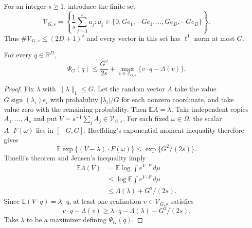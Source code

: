 For an integer $s\geq1$, introduce the finite set
\[
 \mathcal V_{G,s}
 =\left\{\frac1s\sum_{j=1}^s a_j:
        a_j\in\{0,Ge_1,-Ge_1,\ldots,Ge_D,-Ge_D\}\right\}.
\]
Thus $\#\mathcal V_{G,s}\leq(2D+1)^s$ and every vector in this set has
$\ell^1$ norm at most $G$.

\begin{lemma}
\label{lem:sparse-dual-net}
For every $q\in\mathbb R^D$,
\begin{equation}\label{eq:sparse-dual-net}
 \Psi_G(q)\leq\frac{G^2}{2s}
   +\max_{v\in\mathcal V_{G,s}}
        \{v\cdot q-\Lambda(v)\}.
\end{equation}
\end{lemma}
\begin{proof}
Fix $\lambda$ with $\|\lambda\|_1\leq G$. Let the random vector $A$
take the value $G\operatorname{sign}(\lambda_i)e_i$ with probability
$|\lambda_i|/G$ for each nonzero coordinate, and take value zero with the
remaining probability. Then $\mathbb EA=\lambda$.
Take independent copies $A_1,\ldots,A_s$ and put
$V=s^{-1}\sum_j A_j\in\mathcal V_{G,s}$.
For each fixed $\omega\in\Omega$, the scalar $A\cdot F(\omega)$ lies
in $[-G,G]$. Hoeffding's exponential-moment inequality therefore gives
\[
 \mathbb E\exp\{(V-\lambda)\cdot F(\omega)\}
 \leq\exp\{G^2/(2s)\}.
\]
Tonelli's theorem and Jensen's inequality imply
\begin{align*}
 \mathbb E\Lambda(V)
 &=\mathbb E\log\int e^{V\cdot F}\,d\mu\\
 &\leq\log\mathbb E\int e^{V\cdot F}\,d\mu\\
 &\leq\Lambda(\lambda)+G^2/(2s).
\end{align*}
Since $\mathbb E(V\cdot q)=\lambda\cdot q$, at least one realization
$v\in\mathcal V_{G,s}$ satisfies
\[
 v\cdot q-\Lambda(v)
 \geq\lambda\cdot q-\Lambda(\lambda)-G^2/(2s).
\]
Take $\lambda$ to be a maximizer defining $\Psi_G(q)$.
\end{proof}

